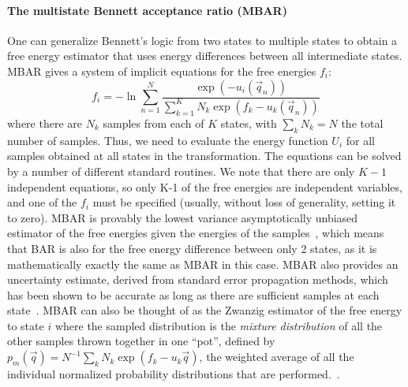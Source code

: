 \documentclass[9pt,bestpractices]{livecoms}
\begin{document}
\paragraph{The multistate Bennett acceptance ratio (MBAR)}
One can generalize Bennett's logic from two states to multiple states to obtain a free energy estimator that uses energy differences between all intermediate states. MBAR gives a system of implicit equations for the free energies $f_i$:
\begin{equation}
f_i = - \ln \sum_{n=1}^{N} \frac{\exp(-u_i(\vec{q}_n))}{\sum_{k=1}^K N_k \exp(f_k-u_k(\vec{q}_n))}
\end{equation}
where there are $N_k$ samples from each of $K$ states, with $\sum_k N_k=N$ the total number of samples. Thus, we need to evaluate the energy function $U_i$ for all samples obtained at all states in the transformation. The equations can be solved by a number of different standard routines. We note that there are only $K-1$ independent equations, so only K-1 of the free energies are independent variables, and one of the $f_i$ must be specified (usually, without loss of generality, setting it to zero).
%
MBAR is provably the lowest variance asymptotically unbiased estimator of the free energies given the energies of the samples~\cite{tan2004likelihood}, which means that BAR is also for the free energy difference between only 2 states, as it is mathematically exactly the same as MBAR in this case. MBAR also provides an uncertainty estimate, derived from standard error propagation methods, which has been shown to be accurate as long as there are sufficient samples at each state~\cite{paliwal2011benchmark}.
%
MBAR can also be thought of as the Zwanzig estimator of the free energy to state $i$ where the sampled distribution is the \textit{mixture distribution} of all the other samples thrown together in one ``pot'', defined by $p_m(\vec{q}) = N^{-1} \sum_k  N_k \exp(f_k-u_k\vec{q})$, the weighted average of all the individual normalized probability distributions that are performed.~\cite{shirts2017reweighting}.
%
\end{document}
